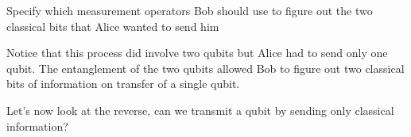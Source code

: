 \begin{exercise}
Specify which measurement operators Bob should use to figure out the two classical bits that Alice wanted to send him
\end{exercise}

Notice that this process did involve two qubits but Alice had to send only one qubit. The entanglement of the two qubits allowed Bob to figure out two classical bits of information on transfer of a single qubit.

Let's now look at the reverse, can we transmit a qubit by sending only classical information?
